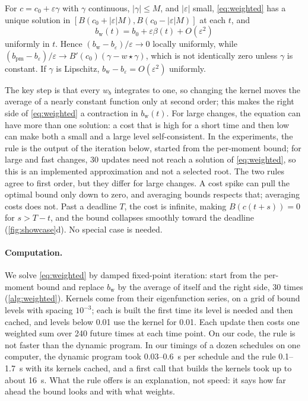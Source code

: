 \documentclass[11pt]{article}
\theoremstyle{definition}
\theoremstyle{remark}
\begin{document}
\begin{proposition}
\label{prop:rule}
For $c = c_0 + \varepsilon\gamma$ with $\gamma$ continuous, $|\gamma| \le M$, and $|\varepsilon|$
small, \eqref{eq:weighted}
has a unique solution in $[B(c_0 + |\varepsilon|M), B(c_0 - |\varepsilon|M)]$ at each $t$, and
\begin{equation}
  b_{\mathrm{w}}(t) = b_0 + \varepsilon\beta(t) + O(\varepsilon^2)
\end{equation}
uniformly in $t$. Hence $(b_{\mathrm{w}} - b_\varepsilon)/\varepsilon \to 0$ locally uniformly,
while $(b_{\mathrm{pm}} - b_\varepsilon)/\varepsilon \to B'(c_0)(\gamma - w \star \gamma)$, which is
not identically zero unless $\gamma$ is constant. If $\gamma$ is Lipschitz,
$b_{\mathrm{w}} - b_\varepsilon = O(\varepsilon^2)$ uniformly.
\end{proposition}

The key step is that every $w_b$ integrates to one, so changing the kernel moves the average of a
nearly constant function only at second order; this makes the right side of
\eqref{eq:weighted} a contraction in $b_{\mathrm{w}}(t)$. For large changes, the equation can have
more than one solution: a cost that is high for a short time and then low can make both a small
and a large level self-consistent. In the experiments, the rule is the output of the iteration below,
started from the per-moment bound; for large and fast changes, 30 updates need not reach a solution
of \eqref{eq:weighted}, so this is an implemented approximation and not a selected root. 
The two rules
agree to first order, but
they differ for large changes. A cost spike can pull the optimal bound only down to zero, and
averaging bounds respects that; averaging costs does not. Past a deadline $T$, the cost is
infinite, making $B(c(t+s)) = 0$ for $s > T - t$, and the bound collapses smoothly toward the
deadline (\cref{fig:showcase}d). No special case is needed.

\paragraph{Computation.}
We solve \eqref{eq:weighted} by damped fixed-point iteration: start from the per-moment bound and
replace $b_{\mathrm{w}}$ by the average of itself and the right side, 30 times
(\cref{alg:weighted}). Kernels come from their eigenfunction series, on a grid of bound levels with
spacing $10^{-3}$; each is built the first time its level is needed and then cached, and levels
below 0.01 use the kernel for 0.01. Each update then costs one weighted sum over 240 future times
at each time point. On our code, the rule is not faster than the dynamic program. In our timings of a dozen schedules
on one computer, the dynamic program took 0.03--0.6~s per schedule and the rule 0.1--1.7~s with its
kernels cached, and a first call that builds the kernels took up to about 16~s. What the rule
offers is an explanation, not speed: it says how far ahead the bound looks and with what weights.
\end{document}
